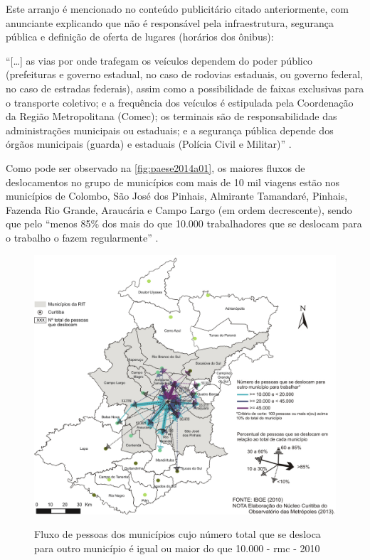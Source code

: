 	Este arranjo é mencionado no conteúdo publicitário citado anteriormente, com anunciante explicando que não é responsável pela infraestrutura, segurança pública e definição de oferta de lugares (horários dos ônibus):
	
	\begin{citacao}
		``[\dots] as vias por onde trafegam os veículos dependem do poder público (prefeituras e governo estadual, no caso de rodovias estaduais, ou governo federal, no caso de estradas federais), assim como a possibilidade de faixas exclusivas para o transporte coletivo; e a frequência dos veículos é estipulada pela Coordenação da Região Metropolitana (Comec); os terminais são de responsabilidade das administrações municipais ou estaduais; e a segurança pública depende dos órgãos municipais (guarda) e estaduais (Polícia Civil e Militar)'' \cite{boreki2019a}.
	\end{citacao}

	Como pode ser observado na \autoref{fig:paese2014a01}, os maiores fluxos de deslocamentos no grupo de municípios com mais de 10 mil viagens estão nos municípios de Colombo, São José dos Pinhais, Almirante Tamandaré, Pinhais, Fazenda Rio Grande, Araucária e Campo Largo (em ordem decrescente), sendo que pelo ``menos 85\% dos mais do que 10.000 trabalhadores que se deslocam para o trabalho o fazem regularmente'' \cite[p. 384]{paese2014a}.
	
	\begin{figure}
		\centering
		\caption{Fluxo de pessoas dos municípios cujo número total que se desloca para outro município é igual ou maior do que 10.000 - \gls{rmc} - 2010}
		\includegraphics[width=0.7\linewidth]{img/paese2014a_01}
		\label{fig:paese2014a01}
	\end{figure}

